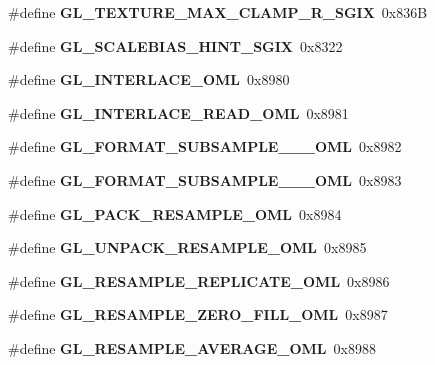 \begin{DoxyCompactItemize}
\item 
\#define {\bfseries G\+L\+\_\+\+T\+E\+X\+T\+U\+R\+E\+\_\+\+M\+A\+X\+\_\+\+C\+L\+A\+M\+P\+\_\+\+R\+\_\+\+S\+G\+I\+X}~0x836\+B\label{_s_d_l__opengl_8h_a7e454185cc01edcf116f7c2949e3eb79}

\item 
\#define {\bfseries G\+L\+\_\+\+S\+C\+A\+L\+E\+B\+I\+A\+S\+\_\+\+H\+I\+N\+T\+\_\+\+S\+G\+I\+X}~0x8322\label{_s_d_l__opengl_8h_ad3df9a770011fa0fbb635f0ab2602cf6}

\item 
\#define {\bfseries G\+L\+\_\+\+I\+N\+T\+E\+R\+L\+A\+C\+E\+\_\+\+O\+M\+L}~0x8980\label{_s_d_l__opengl_8h_a745522ff805e2f98e24950858d496666}

\item 
\#define {\bfseries G\+L\+\_\+\+I\+N\+T\+E\+R\+L\+A\+C\+E\+\_\+\+R\+E\+A\+D\+\_\+\+O\+M\+L}~0x8981\label{_s_d_l__opengl_8h_aa8227e116def16e08615c1a94b5e09b0}

\item 
\#define {\bfseries G\+L\+\_\+\+F\+O\+R\+M\+A\+T\+\_\+\+S\+U\+B\+S\+A\+M\+P\+L\+E\+\_\+\_\+\_\+\+O\+M\+L}~0x8982\label{_s_d_l__opengl_8h_ab3ae603f1bf87c0f17546c1dd5e595f1}

\item 
\#define {\bfseries G\+L\+\_\+\+F\+O\+R\+M\+A\+T\+\_\+\+S\+U\+B\+S\+A\+M\+P\+L\+E\+\_\+\_\+\_\+\+O\+M\+L}~0x8983\label{_s_d_l__opengl_8h_aea886532b08c9c42548ceef3cd6a27d8}

\item 
\#define {\bfseries G\+L\+\_\+\+P\+A\+C\+K\+\_\+\+R\+E\+S\+A\+M\+P\+L\+E\+\_\+\+O\+M\+L}~0x8984\label{_s_d_l__opengl_8h_a556bfb1b6527bd01115a665c57cbe5d0}

\item 
\#define {\bfseries G\+L\+\_\+\+U\+N\+P\+A\+C\+K\+\_\+\+R\+E\+S\+A\+M\+P\+L\+E\+\_\+\+O\+M\+L}~0x8985\label{_s_d_l__opengl_8h_a4f3f7b1f54ff2feaea0fe258595917d5}

\item 
\#define {\bfseries G\+L\+\_\+\+R\+E\+S\+A\+M\+P\+L\+E\+\_\+\+R\+E\+P\+L\+I\+C\+A\+T\+E\+\_\+\+O\+M\+L}~0x8986\label{_s_d_l__opengl_8h_a40ef2455bab17770e83c0953d7d26874}

\item 
\#define {\bfseries G\+L\+\_\+\+R\+E\+S\+A\+M\+P\+L\+E\+\_\+\+Z\+E\+R\+O\+\_\+\+F\+I\+L\+L\+\_\+\+O\+M\+L}~0x8987\label{_s_d_l__opengl_8h_a9c4a63eaa6492d676a10fb08bcc849c5}

\item 
\#define {\bfseries G\+L\+\_\+\+R\+E\+S\+A\+M\+P\+L\+E\+\_\+\+A\+V\+E\+R\+A\+G\+E\+\_\+\+O\+M\+L}~0x8988\label{_s_d_l__opengl_8h_aed076e3a192aeb1e0ab4c321fb6de486}


\end{DoxyCompactItemize}
